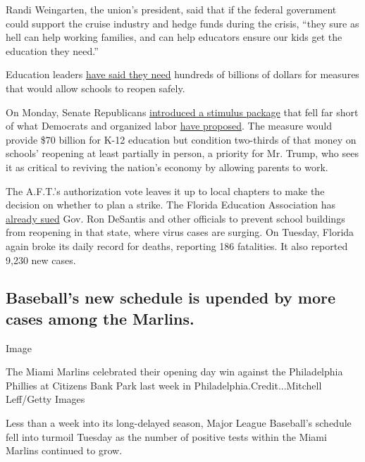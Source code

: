 Randi Weingarten, the union's president, said that if the federal
government could support the cruise industry and hedge funds during the
crisis, ``they sure as hell can help working families, and can help
educators ensure our kids get the education they need.''

Education leaders
\href{https://www.nytimes3xbfgragh.onion/2020/07/09/us/schools-reopening-trump.html}{have
said they need} hundreds of billions of dollars for measures that would
allow schools to reopen safely.

On Monday, Senate Republicans
\href{https://www.nytimes3xbfgragh.onion/2020/07/27/us/politics/republicans-jobless-aid.html}{introduced
a stimulus package} that fell far short of what Democrats and organized
labor
\href{https://www.nytimes3xbfgragh.onion/2020/07/09/us/schools-reopening-trump.html}{have
proposed}. The measure would provide \$70 billion for K-12 education but
condition two-thirds of that money on schools' reopening at least
partially in person, a priority for Mr. Trump, who sees it as critical
to reviving the nation's economy by allowing parents to work.

The A.F.T.'s authorization vote leaves it up to local chapters to make
the decision on whether to plan a strike. The Florida Education
Association has
\href{https://www.nytimes3xbfgragh.onion/reuters/2020/07/20/us/20reuters-health-coronvirus-usa-florida.html}{already
sued} Gov. Ron DeSantis and other officials to prevent school buildings
from reopening in that state, where virus cases are surging. On Tuesday,
Florida again broke its daily record for deaths, reporting 186
fatalities. It also reported 9,230 new cases.

\hypertarget{baseballs-new-schedule-is-upended-by-more-cases-among-the-marlins}{%
\subsection{Baseball's new schedule is upended by more cases among the
Marlins.}\label{baseballs-new-schedule-is-upended-by-more-cases-among-the-marlins}}

Image

The Miami Marlins celebrated their opening day win against the
Philadelphia Phillies at Citizens Bank Park last week in
Philadelphia.Credit...Mitchell Leff/Getty Images

Less than a week into its long-delayed season, Major League Baseball's
schedule fell into turmoil Tuesday as the number of positive tests
within the Miami Marlins continued to grow.

